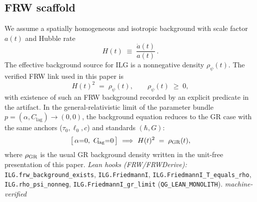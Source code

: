 \documentclass[12pt,a4paper]{article}
\begin{document}
\subsection{FRW scaffold}
We assume a spatially homogeneous and isotropic background with scale factor \(a(t)\) and Hubble rate
\begin{equation}
  H(t) \;\equiv\; \frac{\dot a(t)}{a(t)}\,.
  \label{eq:H-def}
\end{equation}
The effective background source for ILG is a nonnegative density \(\rho_\psi(t)\). The verified FRW link used in this paper is
\begin{equation}
  H(t)^2 \;=\; \rho_\psi(t),
  \qquad
  \rho_\psi(t)\;\ge\;0,
  \label{eq:friedmannI}
\end{equation}
with existence of such an FRW background recorded by an explicit predicate in the artifact. In the general-relativistic limit of the parameter bundle \(p=(\alpha,C_{\!\mathrm{lag}})\to (0,0)\), the background equation reduces to the GR case with the same anchors (\(\tau_0,\ell_0,c\)) and standards \((\hbar,G)\):
\begin{equation}
  \bigl[\,\alpha{=}0,\ C_{\!\mathrm{lag}}{=}0\,\bigr]\ \Longrightarrow\
  H(t)^2 \;=\; \rho_{\rm GR}(t),
  \label{eq:friedmannI-GR}
\end{equation}
where \(\rho_{\rm GR}\) is the usual GR background density written in the unit-free presentation of this paper. 
\emph{Lean hooks (FRW/FRWDerive):} \texttt{ILG.frw\_background\_exists}, \texttt{ILG.FriedmannI}, \texttt{ILG.FriedmannI\_T\_equals\_rho}, \texttt{ILG.rho\_psi\_nonneg}, \texttt{ILG.FriedmannI\_gr\_limit} (\texttt{QG\_LEAN\_MONOLITH}). \emph{machine-verified}
\end{document}
